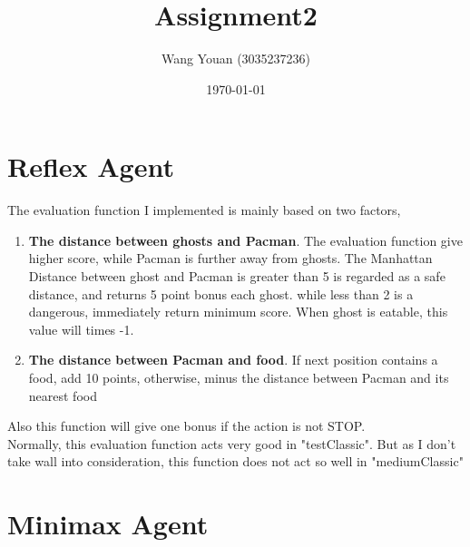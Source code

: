 \documentclass{article}
\title{Assignment2}
\author{Wang Youan (3035237236)}
\date{\today}
\begin{document}
	\maketitle
	\section{Reflex Agent}
	\label{sec:Q1}
	The evaluation function I implemented is mainly based on two factors,
	\begin{enumerate}
		\item \textbf{The distance between ghosts and Pacman}. The evaluation function give higher score, while Pacman is further away from ghosts. The Manhattan Distance between ghost and Pacman is greater than 5 is regarded as a safe distance, and returns 5 point bonus each ghost. while less than 2 is a dangerous, immediately return minimum score. When ghost is eatable, this value will times -1. 
		\item \textbf{The distance between Pacman and food}. If next position contains a food, add 10 points, otherwise, minus the distance between Pacman and its nearest food 
	\end{enumerate}
	Also this function will give one bonus if the action is not STOP.\\
	Normally, this evaluation function acts very good in "testClassic". But as I don't take wall into consideration, this function does not act so well in "mediumClassic"
	\section{Minimax Agent}
	\label{sec:Q2}
\end{document}
